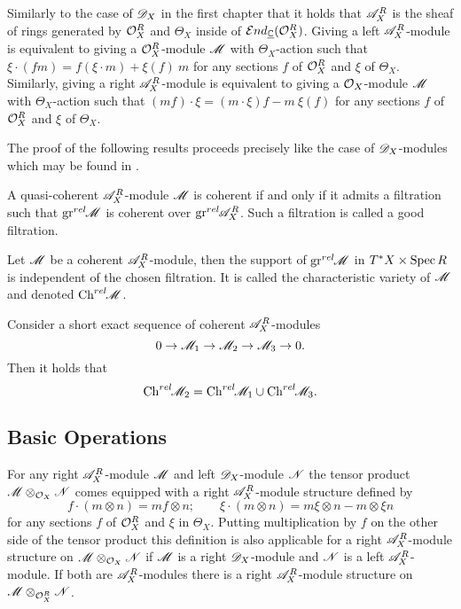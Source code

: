 Similarly to the case of $\mathscr{D}_X$ in the first chapter that  it holds that $\mathscr{A}_X^R$ is the sheaf of rings generated by $\mathcal{O}_X^R$ and $\Theta_X$ inside of $\mathcal{E}nd_{\underline{\mathbb{C}}}(\mathcal{O}_X^R)$. Giving a left $\mathscr{A}_X^R$-module is equivalent to giving a $\mathcal{O}_X^R$-module $\mathscr{M}$ with $\Theta_X$-action such that
$\xi\cdot (fm) = f (\xi \cdot m)  + \xi(f)\ m  $
for any sections $f$ of $\mathcal{O}_X^R$ and $\xi$ of $\Theta_X$. Similarly, giving a right $\mathscr{A}_X^R$-module is equivalent to giving a $\mathcal{O}_X$-module $\mathscr{M}$ with $\Theta_X$-action such that $(mf)\cdot\xi = (m\cdot\xi)f - m\ \xi(f) $ for any sections $f$ of $\mathcal{O}_X^R$ and $\xi$ of $\Theta_X$.

The proof of the following results proceeds precisely like the case of $\mathscr{D}_X$-modules which may be found in \cite[Chapter 2]{hotta2007d}. 
\begin{proposition}\label{prop: CoherentAndGoodFiltration}
    A quasi-coherent $\mathscr{A}_X^R$-module $\mathscr{M}$ is coherent if and only if it admits a filtration such that $\operatorname{gr}^{rel}\mkern-5mu \mathscr{M}$ is coherent over $\operatorname{gr}^{rel}\mkern-5mu \mathscr{A}_X^R$. Such a filtration is called a good filtration.
\end{proposition}
\begin{proposition}
    Let $\mathscr{M}$ be a coherent $\mathscr{A}_X^R$-module, then the support of $\operatorname{gr}^{rel}\mkern-5mu \mathscr{M}$ in $T^*X \times \operatorname{Spec} R$ is independent of the chosen filtration. It is called the characteristic variety of $\mathscr{M}$ and denoted $\operatorname{Ch}^{rel}\mkern-5mu \mathscr{M}$.
\end{proposition}
\begin{lemma}\label{lem: SESBehaviourA}
    Consider a short exact sequence of coherent $\mathscr{A}_X^R$-modules
    $$0\to \mathscr{M}_1 \to \mathscr{M}_2 \to\mathscr{M}_3 \to 0. $$
    Then it holds that
    $$\operatorname{Ch}^{rel}\mkern-5mu \mathscr{M}_2 = \operatorname{Ch}^{rel}\mkern-5mu \mathscr{M}_1 \cup \operatorname{Ch}^{rel}\mkern-5mu \mathscr{M}_3. $$
\end{lemma}
\subsection{Basic Operations}\label{sec: BasicOperations}
For any right $\mathscr{A}_{X}^R$-module $\mathscr{M}$ and left $\mathscr{D}_X$-module $\mathscr{N}$ the tensor product $\mathscr{M} \otimes_{\mathcal{O}_X} \mathscr{N}$ comes equipped with a right $\mathscr{A}_X^R$-module structure defined by
$$f\cdot (m\otimes n) = mf \otimes n; \qquad \xi \cdot (m\otimes n) = m\xi \otimes n - m\otimes \xi n $$
for any sections $f$ of $\mathcal{O}_X^R$ and $\xi$ in $\Theta_X$. Putting multiplication by $f$ on the other side of the tensor product this definition is also applicable for a right $\mathscr{A}_X^R$-module structure on $\mathscr{M}\otimes_{\mathcal{O}_X} \mathscr{N}$ if $\mathscr{M}$ is a right $\mathscr{D}_X$-module and $\mathscr{N}$ is a left $\mathscr{A}_X^R$-module. If both are $\mathscr{A}_X^R$-modules there is a right $\mathscr{A}_X^R$-module structure on $\mathscr{M}\otimes_{\mathcal{O}_X^R} \mathscr{N}$.

